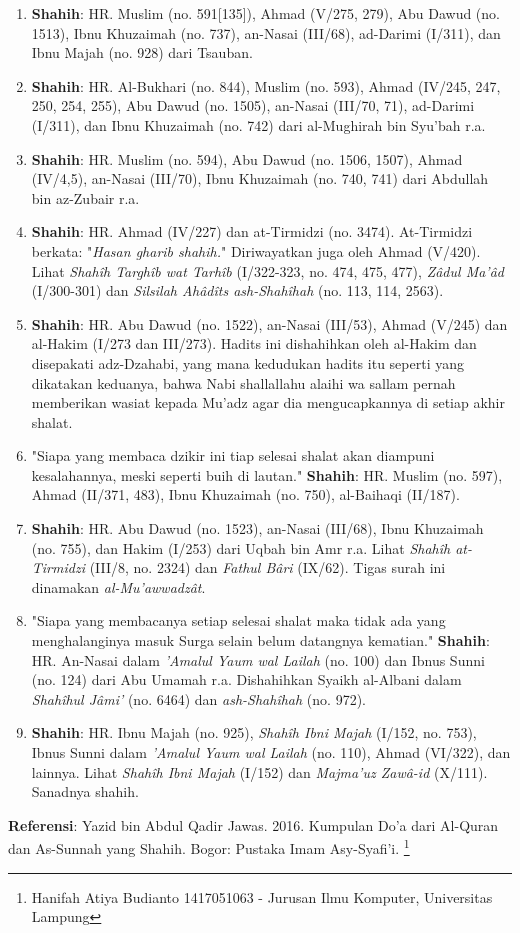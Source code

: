 \documentclass[a4paper,12pt]{article}
\begin{document}
\begin{enumerate}
\item \textbf{Shahih}: HR. Muslim (no. 591[135]), Ahmad (V/275, 279), Abu 
Dawud (no. 1513), Ibnu Khuzaimah (no. 737), an-Nasai (III/68), ad-Darimi 
(I/311), dan Ibnu Majah (no. 928) dari Tsauban.
\item \textbf{Shahih}: HR. Al-Bukhari (no. 844), Muslim (no. 593), Ahmad 
(IV/245, 247, 250, 254, 255), Abu Dawud (no. 1505), an-Nasai (III/70, 71), 
ad-Darimi (I/311), dan Ibnu Khuzaimah (no. 742) dari al-Mughirah bin Syu'bah 
r.a.
\item \textbf{Shahih}: HR. Muslim (no. 594), Abu Dawud (no. 1506, 1507), 
Ahmad (IV/4,5), an-Nasai (III/70), Ibnu Khuzaimah (no. 740, 741) dari 
Abdullah bin az-Zubair r.a.
\item \textbf{Shahih}: HR. Ahmad (IV/227) dan at-Tirmidzi (no. 3474). 
At-Tirmidzi berkata: "\textit{Hasan gharib shahih.}" Diriwayatkan juga oleh 
Ahmad (V/420). Lihat \textit{Shah\^{i}h Targh\^{i}b wat Tarh\^{i}b} 
(I/322-323, no. 474, 475, 477), \textit{Z\^{a}dul Ma'\^{a}d} (I/300-301) dan 
\textit{Silsilah Ah\^{a}d\^{i}ts ash-Shah\^{i}hah} (no. 113, 114, 2563).
\item \textbf{Shahih}: HR. Abu Dawud (no. 1522), an-Nasai (III/53), Ahmad 
(V/245) dan al-Hakim (I/273 dan III/273). Hadits ini dishahihkan oleh 
al-Hakim dan disepakati adz-Dzahabi, yang mana kedudukan hadits itu seperti 
yang dikatakan keduanya, bahwa Nabi shallallahu alaihi wa sallam pernah 
memberikan wasiat kepada Mu'adz agar dia mengucapkannya di setiap akhir 
shalat.
\item "Siapa yang membaca dzikir ini tiap selesai shalat akan diampuni 
kesalahannya, meski seperti buih di lautan." \textbf{Shahih}: HR. Muslim 
(no. 597), Ahmad (II/371, 483), Ibnu Khuzaimah (no. 750), al-Baihaqi 
(II/187).
\item \textbf{Shahih}: HR. Abu Dawud (no. 1523), an-Nasai (III/68), Ibnu 
Khuzaimah (no. 755), dan Hakim (I/253) dari Uqbah bin Amr r.a. Lihat 
\textit{Shah\^{i}h at-Tirmidzi} (III/8, no. 2324) dan \textit{Fathul 
B\^{a}ri} (IX/62). Tigas surah ini dinamakan \textit{al-Mu'awwadz\^{a}t}.
\item "Siapa yang membacanya setiap selesai shalat maka tidak ada yang 
menghalanginya masuk Surga selain belum datangnya kematian." 
\textbf{Shahih}: HR. An-Nasai dalam \textit{'Amalul Yaum wal Lailah} (no. 
100) dan Ibnus Sunni (no. 124) dari Abu Umamah r.a. Dishahihkan Syaikh 
al-Albani dalam \textit{Shah\^{i}hul J\^{a}mi'} (no. 6464) dan 
\textit{ash-Shah\^{i}hah} (no. 972).
\item \textbf{Shahih}: HR. Ibnu Majah (no. 925), \textit{Shah\^{i}h Ibni 
Majah} (I/152, no. 753), Ibnus Sunni dalam \textit{'Amalul Yaum wal Lailah} 
(no. 110), Ahmad (VI/322), dan lainnya. Lihat \textit{Shah\^{i}h Ibni Majah} 
(I/152) dan \textit{Majma'uz Zaw\^{a}-id} (X/111). Sanadnya shahih.
\end{enumerate}
\textbf{Referensi}: Yazid bin Abdul Qadir Jawas. 2016. Kumpulan Do'a dari
Al-Quran dan As-Sunnah yang Shahih. Bogor: Pustaka Imam Asy-Syafi'i.
\footnote{Hanifah Atiya Budianto 1417051063 - Jurusan Ilmu Komputer,
Universitas Lampung}
\end{document}
